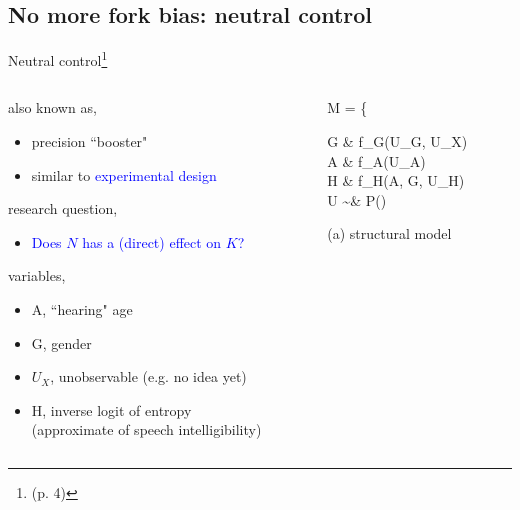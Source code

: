 \subsection{No more fork bias: neutral control}
%
%
\begin{frame}[t, negative]
	\subsectionpage
\end{frame}
%
%
\begin{frame}
	{Neutral control\footnote{\citet{Cinelli_et_al_2021} (p. 4)}}
	\begin{columns}
		\begin{column}{0.5\textwidth}
			also known as,
			\begin{itemize}
				\item precision ``booster"
				\item similar to \textcolor{blue}{experimental design}
			\end{itemize}
			
			research question, 
			\begin{itemize}
				\item \textcolor{blue}{Does $N$ has a (direct) effect on $K$?}
			\end{itemize}
			
			variables,
			\begin{itemize}
				\item A, ``hearing" age
				\item G, gender
				\item $U_{X}$, unobservable (e.g. no idea yet)
				\item H, inverse logit of entropy\\
				{\small (approximate of speech intelligibility)}
			\end{itemize}
		\end{column}
		\begin{column}{0.5\textwidth}  
			\begin{equ}
				M = \left\{ \begin{aligned} 
					G \leftarrow & \; f_{G}(U_{G}, U_{X}) \\
					A \leftarrow & \; f_{A}(U_{A}) \\
					H \leftarrow & \; f_{H}(A, G, U_{H}) \\
					U \sim & \; P()
				\end{aligned} \right
				\caption*{(a) structural model}
			\end{equ}
			\begin{figure}
\end{figure}
\end{column}
\end{columns}
\end{frame}
